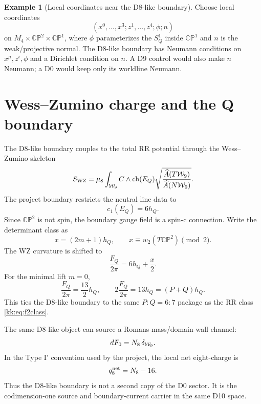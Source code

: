 \documentclass[11pt]{article}
\newcommand{\CP}{\mathbb{CP}}
\theoremstyle{plain}
\theoremstyle{definition}
\newtheorem{example}[proposition]{Example}
\begin{document}
\begin{example}[Local coordinates near the D8-like boundary]
\label{kk:ex:d8-coordinates}
Choose local coordinates
\[
  (x^0,\ldots,x^3;z^1,\ldots,z^4;\phi;n)
\]
on \(M_4\times\CP^2\times\CP^1\), where \(\phi\) parameterizes the \(S^1_Q\)
inside \(\CP^1\) and \(n\) is the weak/projective normal.  The D8-like boundary
has Neumann conditions on \(x^\mu,z^i,\phi\) and a Dirichlet condition on \(n\).
A D9 control would also make \(n\) Neumann; a D0 would keep only its worldline
Neumann.
\end{example}

\section{Wess--Zumino charge and the Q boundary}
\label{kk:sec:wz-q}

The D8-like boundary couples to the total RR potential through the Wess--Zumino
skeleton
\begin{equation}
  S_{\rm WZ}=\mu_8\int_{{\cal W}_9}
  C\wedge {\rm ch}(E_Q)
  \sqrt{\frac{\widehat A(T{\cal W}_9)}{\widehat A(N{\cal W}_9)}} .
  \label{kk:eq:wz}
\end{equation}
The project boundary restricts the neutral line data to
\begin{equation}
  c_1(E_Q)=6h_Q .
  \label{kk:eq:eq}
\end{equation}
Since \(\CP^2\) is not spin, the boundary gauge field is a spin-c connection.
Write the determinant class as
\begin{equation}
  x=(2m+1)h_Q,\qquad x\equiv w_2(T\CP^2)\pmod 2 .
\end{equation}
The WZ curvature is shifted to
\begin{equation}
  \frac{F_Q}{2\pi}=6h_Q+\frac{x}{2}.
  \label{kk:eq:fwshift}
\end{equation}
For the minimal lift \(m=0\),
\begin{equation}
  \frac{F_Q}{2\pi}=\frac{13}{2}h_Q,\qquad
  2\frac{F_Q}{2\pi}=13h_Q=(P+Q)h_Q .
  \label{kk:eq:pqsignal}
\end{equation}
This ties the D8-like boundary to the same \(P:Q=6:7\) package as the RR class
\eqref{kk:eq:f2class}.

The same D8-like object can source a Romans-mass/domain-wall channel:
\begin{equation}
  dF_0=N_8\,\delta_{{\cal W}_9}.
  \label{kk:eq:romans}
\end{equation}
In the Type I' convention used by the project, the local net eight-charge is
\begin{equation}
  q_8^{\rm net}=N_8-16.
\end{equation}
Thus the D8-like boundary is not a second copy of the D0 sector.  It is the
codimension-one source and boundary-current carrier in the same D10 space.
\end{document}
